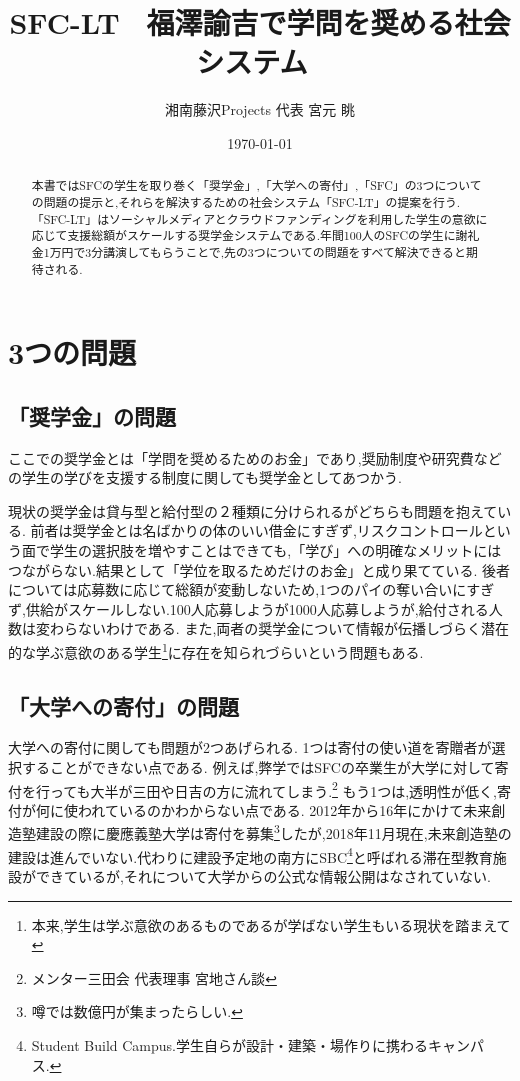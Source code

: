 \documentclass[uplatex, a4j]{jsarticle}
\date{\today}
\title{SFC-LT ~福澤諭吉で学問を奨める社会システム~}
\author{湘南藤沢Projects 代表 宮元 眺}
\begin{document}


\maketitle
\begin{abstract}
  本書ではSFCの学生を取り巻く「奨学金」,「大学への寄付」,「SFC」の3つについての問題の提示と,それらを解決するための社会システム「SFC-LT」の提案を行う.「SFC-LT」はソーシャルメディアとクラウドファンディングを利用した学生の意欲に応じて支援総額がスケールする奨学金システムである.年間100人のSFCの学生に謝礼金1万円で3分講演してもらうことで,先の3つについての問題をすべて解決できると期待される.

\end{abstract}

\section{3つの問題}

\subsection{「奨学金」の問題}
  ここでの奨学金とは「学問を奨めるためのお金」であり,奨励制度や研究費などの学生の学びを支援する制度に関しても奨学金としてあつかう.

  現状の奨学金は貸与型と給付型の２種類に分けられるがどちらも問題を抱えている.
  前者は奨学金とは名ばかりの体のいい借金にすぎず,リスクコントロールという面で学生の選択肢を増やすことはできても,「学び」への明確なメリットにはつながらない.結果として「学位を取るためだけのお金」と成り果てている.
  後者については応募数に応じて総額が変動しないため,1つのパイの奪い合いにすぎず,供給がスケールしない.100人応募しようが1000人応募しようが,給付される人数は変わらないわけである.
  また,両者の奨学金について情報が伝播しづらく潜在的な学ぶ意欲のある学生\footnote{本来,学生は学ぶ意欲のあるものであるが学ばない学生もいる現状を踏まえて}に存在を知られづらいという問題もある.


\subsection{「大学への寄付」の問題}
  大学への寄付に関しても問題が2つあげられる.
  1つは寄付の使い道を寄贈者が選択することができない点である.
  例えば,弊学ではSFCの卒業生が大学に対して寄付を行っても大半が三田や日吉の方に流れてしまう.\footnote{メンター三田会 代表理事 宮地さん談}
  もう1つは,透明性が低く,寄付が何に使われているのかわからない点である.
  2012年から16年にかけて未来創造塾建設の際に慶應義塾大学は寄付を募集\footnote{噂では数億円が集まったらしい.}したが,2018年11月現在,未来創造塾の建設は進んでいない.代わりに建設予定地の南方にSBC\footnote{Student Build Campus.学生自らが設計・建築・場作りに携わるキャンパス.}と呼ばれる滞在型教育施設ができているが,それについて大学からの公式な情報公開はなされていない\cite{mirai}.
\end{document}
